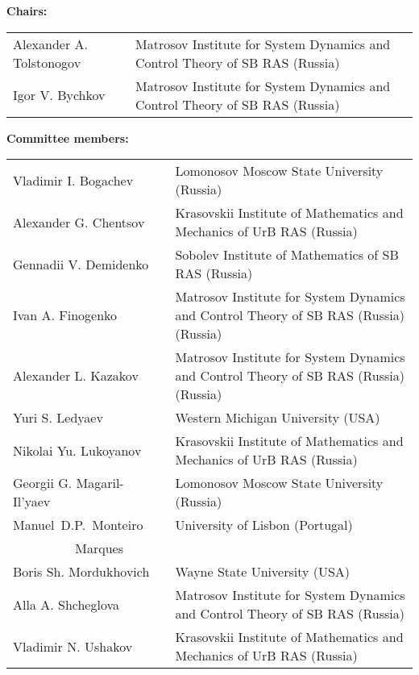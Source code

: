 \documentclass[12pt,final]{llncs}
\begin{document}
 \begin{englisharticle}

\textbf{Chairs:   }

\begin{tabular}{@{}p{6cm}@{}p{10cm}@{}}
  Alexander A. Tolstonogov &   Matrosov
Institute for System Dynamics and Control Theory of SB RAS (Russia)\\
Igor V. Bychkov &   Matrosov
Institute for System Dynamics and Control Theory of SB RAS (Russia)
\end{tabular}

\textbf{Committee members:}

\begin{tabular}{@{}p{5.5cm}@{}p{0.5cm}@{}p{10cm}@{}}
Vladimir I. Bogachev & & Lomonosov Moscow State University  (Russia)\\[0.5em]
Alexander G. Chentsov  &&  Krasovskii Institute of Mathematics and Mechanics of UrB RAS (Russia)\\[0.5em]
Gennadii V. Demidenko &&  Sobolev Institute of Mathematics of SB RAS (Russia)\\[0.5em]
Ivan A. Finogenko &&  Matrosov
Institute for System Dynamics and Control Theory of SB RAS (Russia)  (Russia)\\[0.5em]
Alexander L. Kazakov &&  Matrosov
Institute for System Dynamics and Control Theory of SB RAS (Russia) (Russia)\\[0.5em]
Yuri S. Ledyaev & & Western Michigan University  (USA)	\\[0.5em]
Nikolai Yu. Lukoyanov &&  Krasovskii Institute of Mathematics and Mechanics of UrB RAS (Russia)\\[0.5em]
Georgii G. Magaril-Il'yaev &&  Lomonosov Moscow State University  (Russia)\\[0.5em]
Manuel~D.P.~Monteiro   && University of Lisbon  (Portugal)\\ 
~~~~~~~~~ Marques && ~\\[0.5em]
Boris Sh. Mordukhovich &&  Wayne State University  (USA)\\[0.5em]
Alla A. Shcheglova &&  Matrosov
Institute for System Dynamics and Control Theory of SB RAS (Russia)\\[0.5em]
Vladimir N. Ushakov &&  Krasovskii Institute of Mathematics and Mechanics of UrB RAS (Russia)
 \end{tabular}









 \end{englisharticle}
\end{document}

